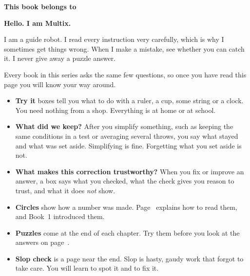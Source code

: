 \thispagestyle{plain}
\begin{center}
{\sans\bfseries\large This book belongs to}\quad\wline[6cm]
\end{center}
\vspace{0.1cm}

{\sans\bfseries\LARGE\color{ink} Hello. I am Multix.}\par
\begin{multix}[wow]\multixbot[wow]\tcblower
I am a guide robot. I read every instruction very carefully, which is why I sometimes get things wrong.
When I make a mistake, see whether you can catch it. I never give away a puzzle answer.
\end{multix}

Every book in this series asks the same few questions, so once you have read this page you will know your way around.

\begin{itemize}[leftmargin=1.6em,itemsep=0.45em]
\item[\textcolor{leaf}{\ding{108}}] \textbf{Try it} boxes tell you what to do with a ruler, a cup, some string or a clock. You need nothing from a shop. Everything is at home or at school.
\item[\textcolor{sun!80!black}{\ding{108}}] \textbf{What did we keep?} After you simplify something, such as keeping the same conditions in a test or averaging several throws, you say what stayed and what was set aside. Simplifying is fine. Forgetting what you set aside is not.
\item[\textcolor{tangerine}{\ding{108}}] \textbf{What makes this correction trustworthy?} When you fix or improve an answer, a box says what you checked, what the check gives you reason to trust, and what it does \emph{not} show.
\item[\textcolor{sky}{\ding{108}}] \textbf{Circles} show how a number was made. Page~\pageref{circlecard} explains how to read them, and Book~1 introduced them.
\item[\textcolor{grape}{\ding{108}}] \textbf{Puzzles} come at the end of each chapter. Try them before you look at the answers on page~\pageref{answers}.
\item[\textcolor{tomato}{\ding{108}}] \textbf{Slop check} is a page near the end. Slop is hasty, gaudy work that forgot to take care. You will learn to spot it and to fix it.
\end{itemize}

